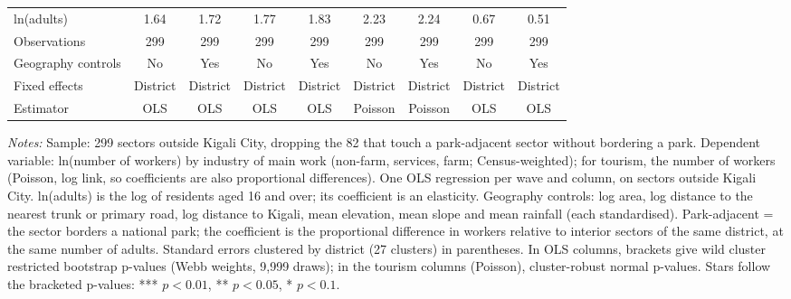 \documentclass[11pt]{article}
\begin{document}
\begin{table}[H]
{\begin{tabular}{lcccccccc}
ln(adults) & 1.64 & 1.72 & 1.77 & 1.83 & 2.23 & 2.24 & 0.67 & 0.51 \\
Observations & 299 & 299 & 299 & 299 & 299 & 299 & 299 & 299 \\
\midrule
Geography controls & No & Yes & No & Yes & No & Yes & No & Yes \\
Fixed effects & District & District & District & District & District & District & District & District \\
Estimator & OLS & OLS & OLS & OLS & Poisson & Poisson & OLS & OLS \\
\bottomrule
\end{tabular}}
\begin{minipage}{0.97\textwidth}\scriptsize
\textit{Notes:} Sample: 299 sectors outside Kigali City, dropping the 82 that touch a park-adjacent sector without bordering a park. Dependent variable: ln(number of workers) by industry of main work (non-farm, services, farm; Census-weighted); for tourism, the number of workers (Poisson, log link, so coefficients are also proportional differences). One OLS regression per wave and column, on sectors outside Kigali City. ln(adults) is the log of residents aged 16 and over; its coefficient is an elasticity. Geography controls: log area, log distance to the nearest trunk or primary road, log distance to Kigali, mean elevation, mean slope and mean rainfall (each standardised). Park-adjacent = the sector borders a national park; the coefficient is the proportional difference in workers relative to interior sectors of the same district, at the same number of adults. Standard errors clustered by district (27 clusters) in parentheses. In OLS columns, brackets give wild cluster restricted bootstrap p-values (Webb weights, 9,999 draws); in the tourism columns (Poisson), cluster-robust normal p-values. Stars follow the bracketed p-values: *** $p<0.01$, ** $p<0.05$, * $p<0.1$.
\end{minipage}
\end{table}
\end{document}
